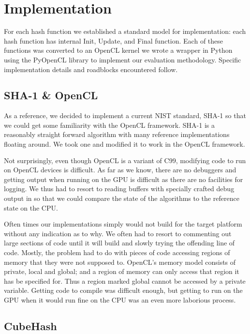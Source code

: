\section*{Implementation}

For each hash function we established a standard model for implementation: each hash function has internal Init, Update, and Final function.
Each of these functions was converted to an OpenCL kernel we wrote a wrapper in Python using the PyOpenCL library to implement our evaluation methodology.
Specific implementation details and roadblocks encountered follow.

\subsection*{SHA-1 \& OpenCL}

As a reference, we decided to implement a current NIST standard, SHA-1 so that we could get some familiarity with the OpenCL framework.
SHA-1 is a reasonably straight forward algorithm with many reference implementations floating around.
We took one and modified it to work in the OpenCL framework.

Not surprisingly, even though OpenCL is a variant of C99, modifying code to run on OpenCL devices is difficult.
As far as we know, there are no debuggers and getting output when running on the GPU is difficult as there are no facilities for logging.
We thus had to resort to reading buffers with specially crafted debug output in so that we could compare the state of the algorithms to the reference state on the CPU.

Often times our implementations simply would not build for the target platform without any indication as to why.
We often had to resort to commenting out large sections of code until it will build and slowly trying the offending line of code.
Mostly, the problem had to do with pieces of code accessing regions of memory that they were not supposed to.
OpenCL's memory model consists of private, local and global; and a region of memory can only access that region it has be specified for.
Thus a region marked global cannot be accessed by a private variable.
Getting code to compile was difficult enough, but getting to run on the GPU when it would run fine on the CPU was an even more laborious process.

\subsection*{CubeHash}



